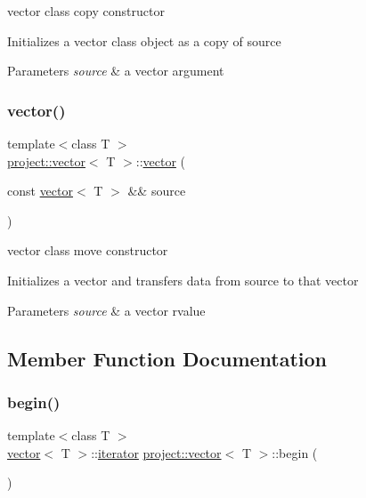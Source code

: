 vector class copy constructor 

Initializes a vector class object as a copy of source 
\begin{DoxyParams}{Parameters}
{\em source} & a vector argument \\
\hline
\end{DoxyParams}
\mbox{\label{classproject_1_1vector_acdd6c35b3513c3be41b5afcfc9470866}} 
\subsubsection{\texorpdfstring{vector()}{vector()}\hspace{0.1cm}{\footnotesize\ttfamily [4/4]}}
{\footnotesize\ttfamily template$<$class T $>$ \\
\mbox{\hyperlink{classproject_1_1vector}{project\+::vector}}$<$ T $>$\+::\mbox{\hyperlink{classproject_1_1vector}{vector}} (\begin{DoxyParamCaption}\item[{const \mbox{\hyperlink{classproject_1_1vector}{vector}}$<$ T $>$ \&\&}]{source }\end{DoxyParamCaption})\hspace{0.3cm}{\ttfamily [inline]}}



vector class move constructor 

Initializes a vector and transfers data from source to that vector 
\begin{DoxyParams}{Parameters}
{\em source} & a vector rvalue \\
\hline
\end{DoxyParams}


\subsection{Member Function Documentation}
\mbox{\label{classproject_1_1vector_a324695bbd462ffcced50b8f3ac75ca68}} 
\subsubsection{\texorpdfstring{begin()}{begin()}\hspace{0.1cm}{\footnotesize\ttfamily [1/2]}}
{\footnotesize\ttfamily template$<$class T $>$ \\
\mbox{\hyperlink{classproject_1_1vector}{vector}}$<$ T $>$\+::\mbox{\hyperlink{classproject_1_1vector_a429c6a5f47b0de55ac858b3be5aeda8b}{iterator}} \mbox{\hyperlink{classproject_1_1vector}{project\+::vector}}$<$ T $>$\+::begin (\begin{DoxyParamCaption}{ }\end{DoxyParamCaption})\hspace{0.3cm}{\ttfamily [inline]}}



